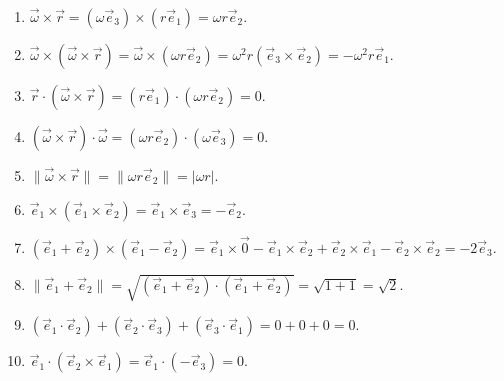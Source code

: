 \begin{sol}
\begin{enumerate}
    \item $\vec{\omega} \times \vec{r} = (\omega\vec{e}_3) \times (r\vec{e}_1) = \omega r \vec{e}_2$.
    \item $\vec{\omega} \times (\vec{\omega} \times \vec{r}) = \vec{\omega} \times (\omega r \vec{e}_2) = \omega^2 r (\vec{e}_3 \times \vec{e}_2) = -\omega^2 r \vec{e}_1$.
    \item $\vec{r} \cdot (\vec{\omega} \times \vec{r}) = (r\vec{e}_1) \cdot (\omega r \vec{e}_2) = 0$.
    \item $(\vec{\omega} \times \vec{r}) \cdot \vec{\omega} = (\omega r \vec{e}_2) \cdot (\omega\vec{e}_3) = 0$.
    \item $\| \vec{\omega} \times \vec{r} \| = \| \omega r \vec{e}_2 \| = |\omega r|$.
    \item $\vec{e}_1 \times (\vec{e}_1 \times \vec{e}_2) = \vec{e}_1 \times \vec{e}_3 = -\vec{e}_2$.
    \item $(\vec{e}_1 + \vec{e}_2) \times (\vec{e}_1 - \vec{e}_2) = \vec{e}_1 \times \vec{0} - \vec{e}_1 \times \vec{e}_2 + \vec{e}_2 \times \vec{e}_1 - \vec{e}_2 \times \vec{e}_2 = -2\vec{e}_3$.
    \item $\| \vec{e}_1 + \vec{e}_2 \| = \sqrt{(\vec{e}_1 + \vec{e}_2) \cdot (\vec{e}_1 + \vec{e}_2)} = \sqrt{1 + 1} = \sqrt{2}$.
    \item $(\vec{e}_1 \cdot \vec{e}_2) + (\vec{e}_2 \cdot \vec{e}_3) + (\vec{e}_3 \cdot \vec{e}_1) = 0 + 0 + 0 = 0$.
    \item $\vec{e}_1 \cdot (\vec{e}_2 \times \vec{e}_1) = \vec{e}_1 \cdot (-\vec{e}_3) = 0$.
\end{enumerate}
\end{sol}